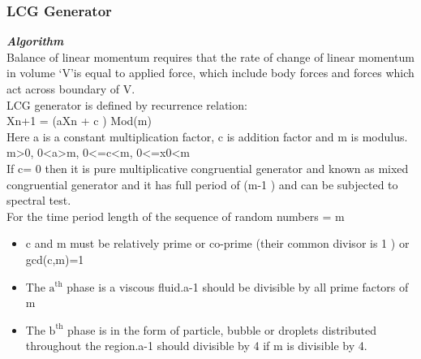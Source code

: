 \documentclass[12pt]{article}
\begin{document}
\subsubsection{LCG Generator}

\textbf{\textit {Algorithm}}\\
Balance of linear momentum requires that the rate of change of linear momentum in volume \lq V\rq is equal to applied force, which include body forces and forces which act across boundary of V.\\
LCG generator is defined by recurrence relation:\\
Xn+1 = (aXn + c ) Mod(m)\\
Here a is a constant multiplication factor, c is addition factor and m is modulus.\\
m\textgreater 0, 0\textless a\textgreater m, 0\textless =c\textless m, 0\textless =x0\textless m\\
If c= 0 then it is pure multiplicative congruential generator and known as mixed congruential generator and it has full period of (m-1 ) and can be subjected to spectral test.\\
For the time period length of the sequence of random numbers = m
\begin{itemize}
\item c and m must be relatively prime or co-prime (their common divisor is 1 ) or gcd(c,m)=1
\item The $\text{a}^{\text{th}}$ phase is a viscous fluid.a-1 should be divisible by all prime factors of m
\item The $\text{b}^{\text{th}}$ phase is in the form of particle, bubble or droplets distributed throughout the region.a-1 should divisible by 4 if m is divisible by 4.
\end{itemize}
\end{document}
